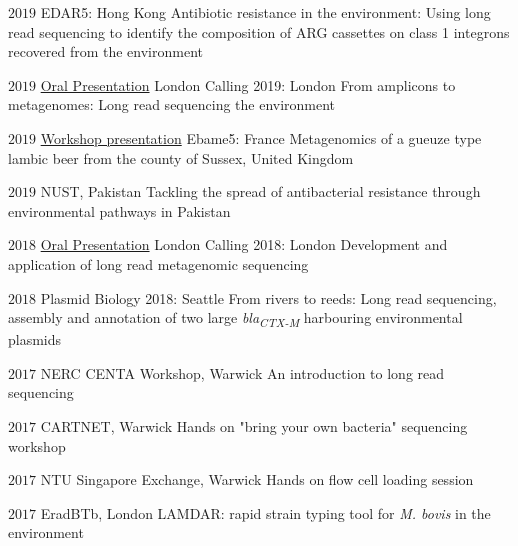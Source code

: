\documentclass[hidelinks]{james-cv} %
\begin{document}
\hspace{-22\parskip}\begin{sentrylist}

\entr
{$2019$}
{}
{EDAR5: Hong Kong}
{Antibiotic resistance in the environment: Using long read sequencing to identify the composition of ARG cassettes on class 1 integrons recovered from the environment}

\entr
{$2019$}
{\bodyfontsc\color{blue}\href{https://www.youtube.com/watch?v=9ObT2ACDnfw}{Oral Presentation}}
{London Calling 2019: London}
{From amplicons to metagenomes: Long read sequencing the environment}

\entr
{$2019$}
{\bodyfontsc\color{blue}\href{https://github.com/BadgerRob/Ebame5/blob/master/Coolship_firle_microflora_workshop.md}{Workshop presentation}}
{Ebame5: France}
{Metagenomics of a gueuze type lambic beer from the county of Sussex, United Kingdom}

\entr
{$2019$}
{}
{NUST, Pakistan}
{Tackling  the spread of antibacterial resistance through environmental pathways in Pakistan}

\entr
{$2018$}
{\bodyfontsc\color{blue}\href{https://vimeo.com/272728056}{Oral Presentation}}
{London Calling 2018: London}
{Development and application of long read metagenomic sequencing}

\entr
{$2018$}
{}
{Plasmid Biology 2018: Seattle}
{From rivers to reeds: Long read sequencing, assembly and annotation of two large \textit{bla}\textit{\textsubscript{CTX-M}} harbouring environmental plasmids}

\entr
{$2017$}
{}
{NERC CENTA Workshop, Warwick}
{An introduction to long read sequencing}

\entr
{$2017$}
{}
{CARTNET, Warwick}
{Hands on "bring your own bacteria" sequencing workshop}

\entr
{$2017$}
{}
{NTU Singapore Exchange, Warwick}
{Hands on flow cell loading session}

\entr
{$2017$}
{}
{EradBTb, London}
{LAMDAR: rapid strain typing tool for \textit {M. bovis} in the environment}

\end{sentrylist}

\end{document}
